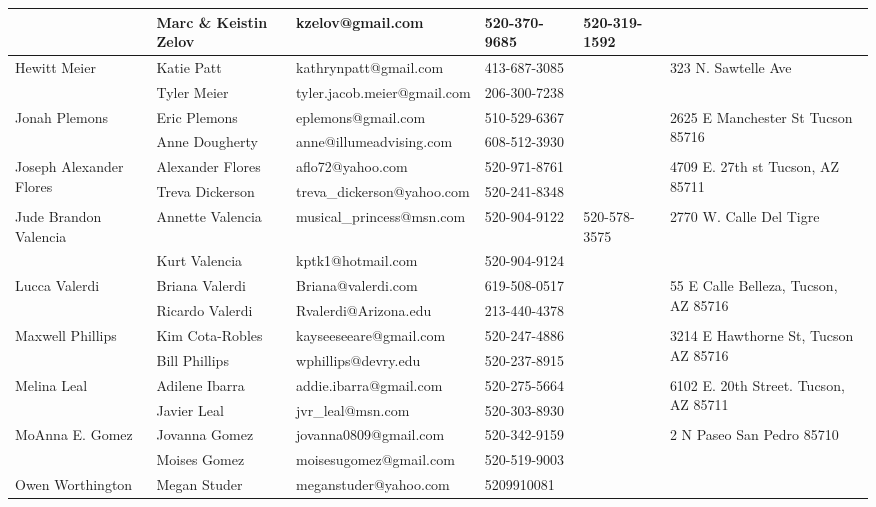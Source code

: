 \documentclass[landscape]{article}\usepackage[]{graphicx}\usepackage[]{color}
\begin{document}
\begin{longtable}{|p{100pt}|p{100pt}|p{140pt}|p{60pt}|p{64pt}|p{120pt}|}
 & Marc \& Keistin Zelov & kzelov@gmail.com & 520-370-9685 & 520-319-1592 & \\
\hline
\multirow{2}{100pt}{Hewitt Meier} & Katie Patt & kathrynpatt@gmail.com & 413-687-3085 &  & \multirow{2}{120pt}{323 N. Sawtelle Ave} \\
 & Tyler Meier & tyler.jacob.meier@gmail.com & 206-300-7238 &  & \\
\hline
\multirow{2}{100pt}{Jonah Plemons} & Eric Plemons & eplemons@gmail.com & 510-529-6367 &  & \multirow{2}{120pt}{2625 E Manchester St Tucson 85716} \\
 & Anne Dougherty & anne@illumeadvising.com & 608-512-3930 &  & \\
\hline
\multirow{2}{100pt}{Joseph Alexander Flores} & Alexander Flores & aflo72@yahoo.com & 520-971-8761 &  & \multirow{2}{120pt}{4709 E. 27th st Tucson, AZ 85711} \\
 & Treva Dickerson & treva\_dickerson@yahoo.com & 520-241-8348 &  & \\
\hline
\multirow{2}{100pt}{Jude Brandon Valencia} & Annette Valencia & musical\_princess@msn.com & 520-904-9122 & 520-578-3575 & \multirow{2}{120pt}{2770 W. Calle Del Tigre} \\
 & Kurt Valencia & kptk1@hotmail.com & 520-904-9124 &  & \\
\hline
\multirow{2}{100pt}{Lucca Valerdi} & Briana Valerdi & Briana@valerdi.com & 619-508-0517 &  & \multirow{2}{120pt}{55 E Calle Belleza, Tucson, AZ 85716} \\
 & Ricardo Valerdi & Rvalerdi@Arizona.edu & 213-440-4378 &  & \\
\hline
\multirow{2}{100pt}{Maxwell Phillips} & Kim Cota-Robles & kayseeseeare@gmail.com & 520-247-4886 &  & \multirow{2}{120pt}{3214 E Hawthorne St, Tucson AZ 85716} \\
 & Bill Phillips & wphillips@devry.edu & 520-237-8915 &  & \\
\hline
\multirow{2}{100pt}{Melina Leal} & Adilene Ibarra & addie.ibarra@gmail.com & 520-275-5664 &  & \multirow{2}{120pt}{6102 E. 20th Street. Tucson, AZ 85711} \\
 & Javier Leal & jvr\_leal@msn.com & 520-303-8930 &  & \\
\hline
\multirow{2}{100pt}{MoAnna E. Gomez} & Jovanna Gomez & jovanna0809@gmail.com & 520-342-9159 &  & \multirow{2}{120pt}{2 N Paseo San Pedro 85710} \\
 & Moises Gomez & moisesugomez@gmail.com & 520-519-9003 &  & \\
\hline
\multirow{2}{100pt}{Owen Worthington} & Megan Studer & meganstuder@yahoo.com & 5209910081 &  & \multirow{2}{120pt}{} \\

\end{longtable}
\end{document}

